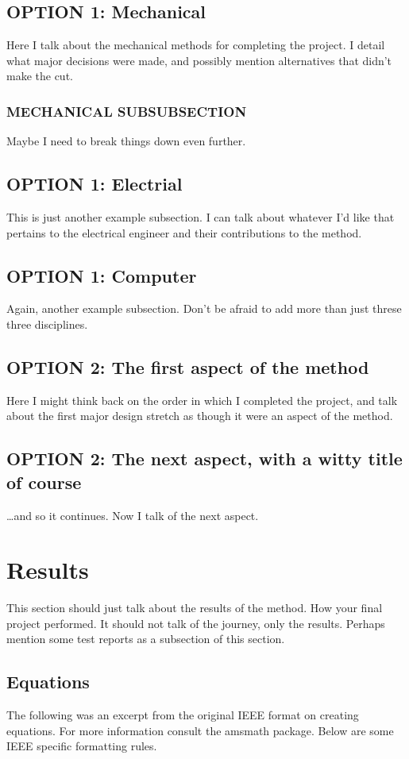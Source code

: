 \documentclass[conference]{IEEEtran}
\begin{document}
\subsection{OPTION 1: Mechanical}
Here I talk about the mechanical methods for completing the project. I detail what major decisions were made, and possibly mention alternatives that didn't make the cut.

\subsubsection{MECHANICAL SUBSUBSECTION}
Maybe I need to break things down even further.

\subsection{OPTION 1: Electrial}
This is just another example subsection. I can talk about whatever I'd like that pertains to the electrical engineer and their contributions to the method.

\subsection{OPTION 1: Computer}
Again, another example subsection. Don't be afraid to add more than just threse three disciplines.

\subsection{OPTION 2: The first aspect of the method}
Here I might think back on the order in which I completed the project, and talk about the first major design stretch as though it were an aspect of the method.

\subsection{OPTION 2: The next aspect, with a witty title of course}
\ldots and so it continues. Now I talk of the next aspect.

\section{Results}
This section should just talk about the results of the method. How your final project performed. It should not talk of the journey, only the results. Perhaps mention some test reports as a subsection of this section.

\subsection{Equations}
The following was an excerpt from the original IEEE format on creating equations. For more information consult the amsmath package. Below are some IEEE specific formatting rules. 
\end{document}
